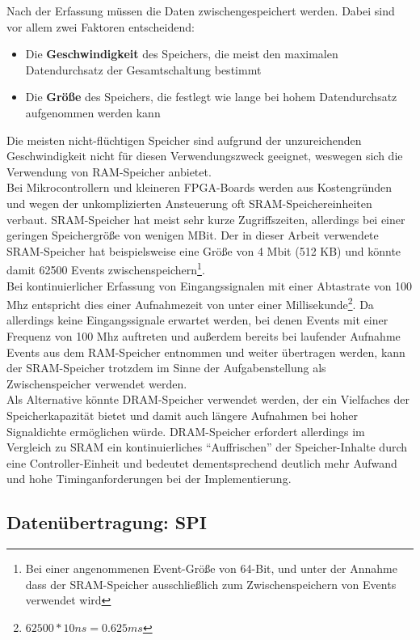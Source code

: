 Nach der Erfassung müssen die Daten zwischengespeichert werden. Dabei sind vor allem zwei Faktoren entscheidend:
\begin{itemize} 
	\item Die \textbf{Geschwindigkeit} des Speichers, die meist den maximalen Datendurchsatz der Gesamtschaltung bestimmt
	\item Die \textbf{Größe} des Speichers, die festlegt wie lange bei hohem Datendurchsatz aufgenommen werden kann 
\end{itemize}
Die meisten nicht-flüchtigen Speicher sind aufgrund der unzureichenden Geschwindigkeit nicht für diesen Verwendungszweck geeignet, weswegen sich die Verwendung von \acrshort{RAM}-Speicher anbietet. \\
Bei Mikrocontrollern und kleineren FPGA-Boards werden aus Kostengründen und wegen der unkomplizierten Ansteuerung oft SRAM-Speichereinheiten verbaut. SRAM-Speicher hat meist sehr kurze Zugriffszeiten, allerdings bei einer geringen Speichergröße von wenigen MBit. Der in dieser Arbeit verwendete SRAM-Speicher hat beispielsweise eine Größe von 4 Mbit (512 KB) und könnte damit 62500 Events zwischenspeichern\footnote{Bei einer angenommenen Event-Größe von 64-Bit, und unter der Annahme dass der SRAM-Speicher ausschließlich zum Zwischenspeichern von Events verwendet wird}.\\
Bei kontinuierlicher Erfassung von Eingangssignalen mit einer Abtastrate von 100 Mhz entspricht dies einer Aufnahmezeit von unter einer Millisekunde\footnote{$62500 * 10 ns = 0.625 ms$}. Da allerdings keine Eingangssignale erwartet werden, bei denen Events mit einer Frequenz von 100 Mhz auftreten und außerdem bereits bei laufender Aufnahme Events aus dem RAM-Speicher entnommen und weiter übertragen werden, kann der SRAM-Speicher trotzdem im Sinne der Aufgabenstellung als Zwischenspeicher verwendet werden.\\
Als Alternative könnte DRAM-Speicher verwendet werden, der ein Vielfaches der Speicherkapazität bietet und damit auch längere Aufnahmen bei hoher Signaldichte ermöglichen würde. DRAM-Speicher erfordert allerdings im Vergleich zu SRAM ein kontinuierliches ``Auffrischen'' der Speicher-Inhalte durch eine Controller-Einheit und bedeutet dementsprechend deutlich mehr Aufwand und hohe Timinganforderungen bei der Implementierung.


\subsection{Datenübertragung: SPI}

